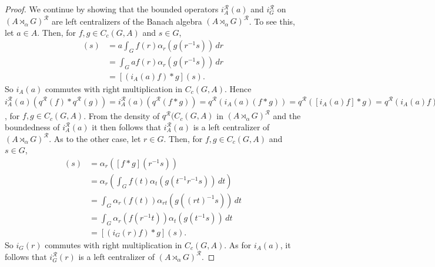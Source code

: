 \documentclass{amsart}
\theoremstyle{plain}
\theoremstyle{definition}
\numberwithin{equation}{section}
\begin{document}
\begin{proof}
We continue by showing that the bounded operators $i_A^{\mathcal R}(a)$ and $i_G^{\mathcal R}$ on ${(A {\rtimes}_\alpha G)^\mathcal{R}}$ are left centralizers of the Banach algebra ${(A {\rtimes}_\alpha G)^\mathcal{R}}$. To see this, let $a\in A$. Then, for $f,g \in C_c(G,A)$ and $s\in G$,
\begin{align*}
 [i_A(a)(f * g)](s) &= a \int_G f(r) \alpha_r(g(r^{-1}s)) \,dr \\
&= \int_G af(r) \alpha_r(g(r^{-1}s)) \,dr \\
&= [(i_A(a)f) * g](s).
\end{align*}
So $i_A(a)$ commutes with right multiplication in $C_c(G,A)$. Hence $i_A^{\mathcal R}(a)({q^{\mathcal R}}(f)*{q^{\mathcal R}}(g))=i_A^{\mathcal R}(a)({q^{\mathcal R}}(f*g))={q^{\mathcal R}}(i_A(a)(f*g))={q^{\mathcal R}}([i_A(a)f]*g)={q^{\mathcal R}}(i_A(a)f)*{q^{\mathcal R}}(g)=[i_A(a)^{\mathcal R}{q^{\mathcal R}}(f)]*{q^{\mathcal R}}(g)$, for $f,g\in C_c(G,A)$.
From the density of ${q^{\mathcal R}}(C_c(G,A)$ in ${(A {\rtimes}_\alpha G)^\mathcal{R}}$ and the boundedness of $i_A^{\mathcal R}(a)$ it then follows that $i_A^{\mathcal R}(a)$ is a left centralizer of ${(A {\rtimes}_\alpha G)^\mathcal{R}}$. As to the other case, let $r \in G$. Then, for $f,g \in C_c(G,A)$ and $s\in G$,
\begin{align*}
 [i_G(r)(f * g)](s) &= \alpha_r ([f * g](r^{-1}s)) \\
&= \alpha_r \left( \int_G f(t) \alpha_t(g(t^{-1}r^{-1}s)) \,dt \right)  \\
&= \int_G \alpha_r(f(t)) \alpha_{rt}(g((rt)^{-1}s)) \,dt \\
&= \int_G \alpha_r(f(r^{-1}t))\alpha_t(g(t^{-1}s)) \,dt \\
&= [(i_G(r)f) * g](s).
\end{align*}
So $i_G(r)$ commutes with right multiplication in $C_c(G,A)$. As for $i_A(a)$, it follows that $i_G^{\mathcal R}(r)$ is a left centralizer of ${(A {\rtimes}_\alpha G)^\mathcal{R}}$.


\end{proof}
\end{document}
